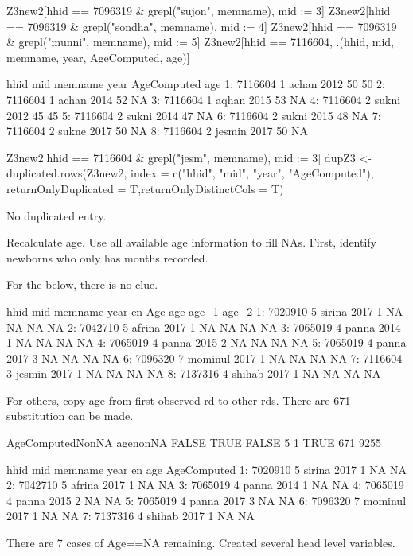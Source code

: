 \begin{Schunk}
\begin{Sinput}
Z3new2[hhid == 7096319 & grepl("sujon", memname), mid := 3]
Z3new2[hhid == 7096319 & grepl("sondha", memname), mid := 4]
Z3new2[hhid == 7096319 & grepl("munni", memname), mid := 5]
Z3new2[hhid == 7116604, .(hhid, mid, memname, year, AgeComputed, age)]
\end{Sinput}
\begin{Soutput}
      hhid mid memname year AgeComputed age
1: 7116604   1   achan 2012          50  50
2: 7116604   1   achan 2014          52  NA
3: 7116604   1   aqhan 2015          53  NA
4: 7116604   2   sukni 2012          45  45
5: 7116604   2   sukni 2014          47  NA
6: 7116604   2   sukni 2015          48  NA
7: 7116604   2   sukne 2017          50  NA
8: 7116604   2  jesmin 2017          50  NA
\end{Soutput}
\begin{Sinput}
Z3new2[hhid == 7116604 & grepl("jesm", memname), mid := 3]
dupZ3 <- duplicated.rows(Z3new2, index = c("hhid", "mid", "year", "AgeComputed"), 
	returnOnlyDuplicated = T,returnOnlyDistinctCols = T)
\end{Sinput}
\begin{Soutput}
[1] No duplicated entry.
\end{Soutput}
\end{Schunk}
Recalculate age. %
Use all available age information to fill NAs. First, identify newborns who only has months recorded. \gobblepars

For the below, there is no clue. 
\begin{Schunk}
\begin{Soutput}
      hhid mid memname year en Age age age_1 age_2
1: 7020910   5  sirina 2017  1  NA  NA    NA    NA
2: 7042710   5  afrina 2017  1  NA  NA    NA    NA
3: 7065019   4   panna 2014  1  NA  NA    NA    NA
4: 7065019   4   panna 2015  2  NA  NA    NA    NA
5: 7065019   4   panna 2017  3  NA  NA    NA    NA
6: 7096320   7 mominul 2017  1  NA  NA    NA    NA
7: 7116604   3  jesmin 2017  1  NA  NA    NA    NA
8: 7137316   4  shihab 2017  1  NA  NA    NA    NA
\end{Soutput}
\end{Schunk}
For others, copy \textsf{age} from first observed rd to other rds. There are 671 substitution can be made. 
\begin{Schunk}
\begin{Soutput}
        AgeComputedNonNA
agenonNA FALSE TRUE
   FALSE     5    1
   TRUE    671 9255
\end{Soutput}
\begin{Soutput}
      hhid mid memname year en age AgeComputed
1: 7020910   5  sirina 2017  1  NA          NA
2: 7042710   5  afrina 2017  1  NA          NA
3: 7065019   4   panna 2014  1  NA          NA
4: 7065019   4   panna 2015  2  NA          NA
5: 7065019   4   panna 2017  3  NA          NA
6: 7096320   7 mominul 2017  1  NA          NA
7: 7137316   4  shihab 2017  1  NA          NA
\end{Soutput}
\end{Schunk}
There are 7 cases of \textsf{Age}==NA remaining. Created several head level variables. \gobblepars

